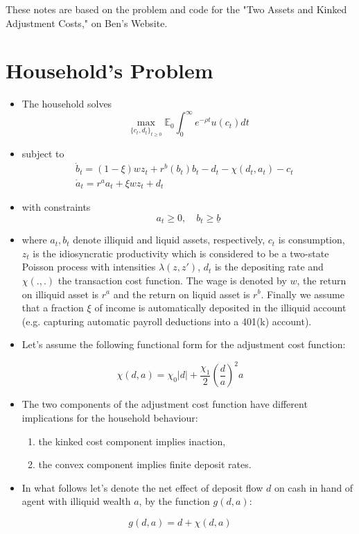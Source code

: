 \documentclass[11pt]{article}
\author{Soroush}
\date{\today}
\title{}
\begin{document}
\tableofcontents

These notes are based on the problem and code for the "Two Assets and Kinked Adjustment Costs," on Ben's Website.

\newpage
\section{Household's Problem}
\label{sec:org14a96c4}
\begin{itemize}
\item The household solves \[\operatorname*{max}_{\{c_t,d_{t}\}_{t\ge 0}} \mathbb{E}_0 \int_{0}^{\infty}e^{-\rho t}u(c_{t})d t\]
\item subject to \[\begin{array}{l} {\displaystyle{\dot{b}}_{t}=(1-\xi)w z_{t}+r^{b}(b_{t})b_{t}-d_{t}-\chi(d_{t},a_{t})-c_{t}}\\ {{\displaystyle{\dot{a}}_{t}=r^{a}a_{t}+\xi w z_{t}+d_{t}}}&{{}}\end{array}\]
\item with constraints \[a_{t}\geq0,\quad b_{t}\geq\underline{{{b}}}\]
\item where \(a_t, b_t\) denote illiquid and liquid assets, respectively, \(c_t\) is consumption, \(z_t\) is the idiosyncratic productivity which is considered to be a two-state Poisson process with intensities \(\lambda(z,z')\), \(d_t\) is the depositing rate and \(\chi(.,.)\) the transaction cost function. The wage is denoted by \(w\), the return on illiquid asset is \(r^a\) and the return on liquid asset is \(r^b\). Finally we assume that a fraction \(\xi\) of income is automatically deposited in the illiquid account (e.g. capturing automatic payroll deductions into a 401(k) account).
\item Let's assume the following functional form for the adjustment cost function:
\end{itemize}
\begin{equation}
\label{eq:1}
\chi(d,a)=\chi_{0}|d|+\frac{\chi_{1}}{2}\left(\frac{d}{a}\right)^{2}a
\end{equation}
\begin{itemize}
\item The two components of the adjustment cost function have different implications for the household behaviour:
\begin{enumerate}
\item the kinked cost component implies inaction,
\item the convex component implies finite deposit rates.
\end{enumerate}
\item In what follows let's denote the net effect of deposit flow \(d\) on cash in hand of agent with illiquid wealth \(a\), by the function \(g(d,a)\):
\end{itemize}
\[g(d,a) = d + \chi(d,a) \]
\end{document}
